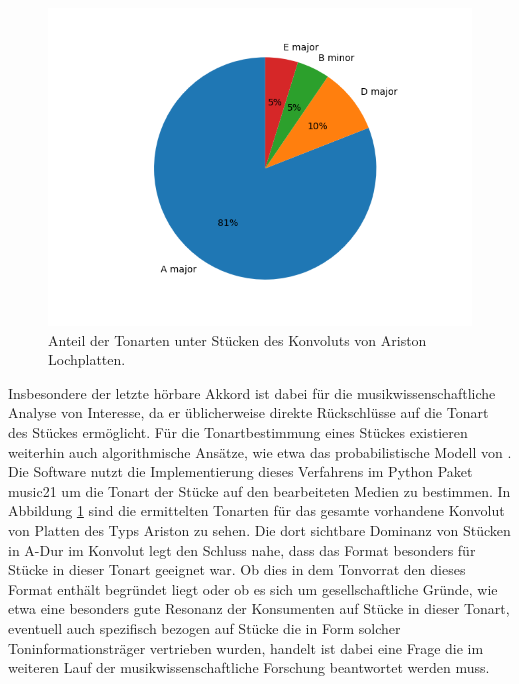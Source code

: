 \begin{figure}[t]
    \centering
    \includegraphics[width=\textwidth]{graphics/pie.png}
    \caption{Anteil der Tonarten unter Stücken des Konvoluts von Ariston Lochplatten.}
    \label{keys}
\end{figure}

Insbesondere der letzte hörbare Akkord ist dabei für die musikwissenschaftliche Analyse von Interesse, da er üblicherweise direkte Rückschlüsse auf die Tonart des Stückes ermöglicht.
Für die Tonartbestimmung eines Stückes existieren weiterhin auch algorithmische Ansätze, wie etwa das probabilistische Modell von \textcite[]{temperley_2002}.
Die  Software nutzt die Implementierung dieses Verfahrens im Python Paket music21 \parencite[]{music21} um die Tonart der Stücke auf den bearbeiteten Medien zu bestimmen.
In Abbildung \ref{keys} sind die ermittelten Tonarten für das gesamte vorhandene Konvolut von Platten des Typs Ariston zu sehen.
Die dort sichtbare Dominanz von Stücken in A-Dur im Konvolut legt den Schluss nahe, dass das Format besonders für Stücke in dieser Tonart geeignet war.
Ob dies in dem Tonvorrat den dieses Format enthält begründet liegt oder ob es sich um gesellschaftliche Gründe, wie etwa eine besonders gute Resonanz der Konsumenten auf Stücke in dieser Tonart, eventuell auch spezifisch bezogen auf Stücke die in Form solcher Toninformationsträger vertrieben wurden, handelt ist dabei eine Frage die im weiteren Lauf der musikwissenschaftliche Forschung beantwortet werden muss.

